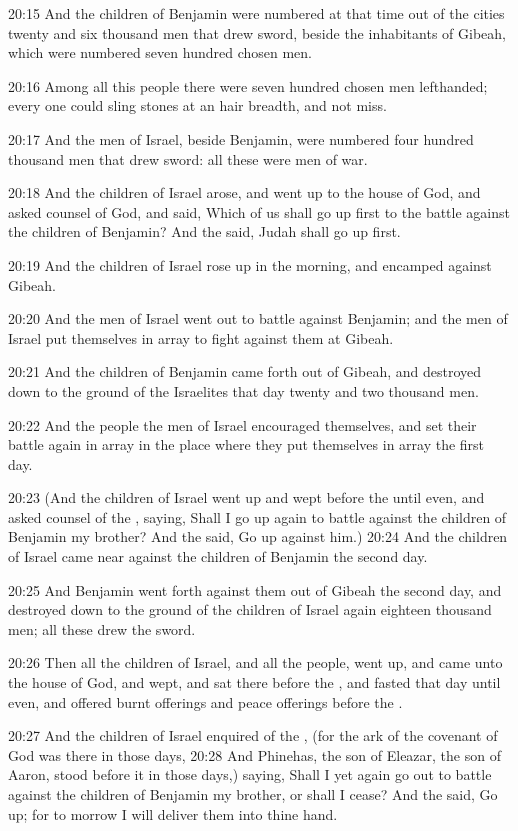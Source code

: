 20:15 And the children of Benjamin were numbered at that time out of
the cities twenty and six thousand men that drew sword, beside the
inhabitants of Gibeah, which were numbered seven hundred chosen men.

20:16 Among all this people there were seven hundred chosen men
lefthanded; every one could sling stones at an hair breadth, and not
miss.

20:17 And the men of Israel, beside Benjamin, were numbered four
hundred thousand men that drew sword: all these were men of war.

20:18 And the children of Israel arose, and went up to the house of
God, and asked counsel of God, and said, Which of us shall go up first
to the battle against the children of Benjamin? And the \LORD said,
Judah shall go up first.

20:19 And the children of Israel rose up in the morning, and encamped
against Gibeah.

20:20 And the men of Israel went out to battle against Benjamin; and
the men of Israel put themselves in array to fight against them at
Gibeah.

20:21 And the children of Benjamin came forth out of Gibeah, and
destroyed down to the ground of the Israelites that day twenty and two
thousand men.

20:22 And the people the men of Israel encouraged themselves, and set
their battle again in array in the place where they put themselves in
array the first day.

20:23 (And the children of Israel went up and wept before the \LORD
until even, and asked counsel of the \LORD, saying, Shall I go up again
to battle against the children of Benjamin my brother? And the \LORD
said, Go up against him.)  20:24 And the children of Israel came near
against the children of Benjamin the second day.

20:25 And Benjamin went forth against them out of Gibeah the second
day, and destroyed down to the ground of the children of Israel again
eighteen thousand men; all these drew the sword.

20:26 Then all the children of Israel, and all the people, went up,
and came unto the house of God, and wept, and sat there before the
\LORD, and fasted that day until even, and offered burnt offerings and
peace offerings before the \LORD.

20:27 And the children of Israel enquired of the \LORD, (for the ark of
the covenant of God was there in those days, 20:28 And Phinehas, the
son of Eleazar, the son of Aaron, stood before it in those days,)
saying, Shall I yet again go out to battle against the children of
Benjamin my brother, or shall I cease? And the \LORD said, Go up; for
to morrow I will deliver them into thine hand.

